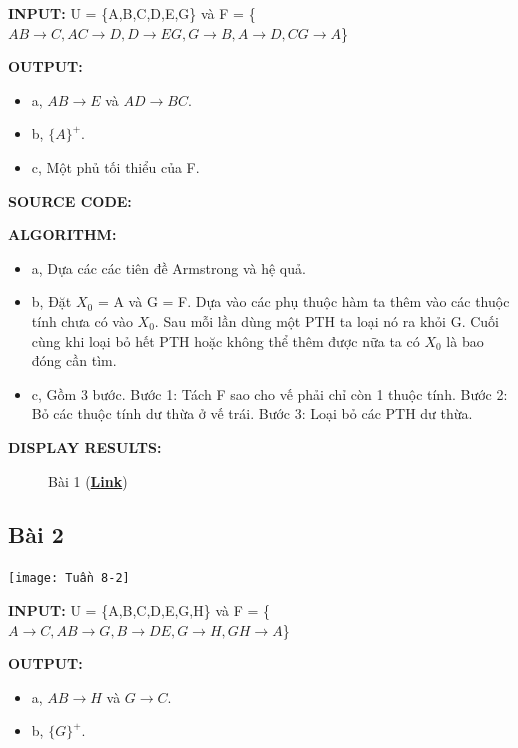 \documentclass[12pt,a4paper]{report}
\begin{document}
	{\bf INPUT:} U = \{A,B,C,D,E,G\} và F = \{$AB\rightarrow C,AC\rightarrow D,D\rightarrow EG,G\rightarrow B,A\rightarrow D,CG\rightarrow A$\}
	
	{\bf OUTPUT:}
	\begin{itemize}
		\item a, $AB\rightarrow E$ và $AD\rightarrow BC$.
		\item b, $\{A\}^+$.
		\item c, Một phủ tối thiểu của F.
	\end{itemize}
	
	{\bf SOURCE CODE:}
	
	{\bf ALGORITHM:}
	\begin{itemize}
		\item a, Dựa các các tiên đề Armstrong và hệ quả.
		\item b, Đặt $X_0$ = A và G = F. Dựa vào các phụ thuộc hàm ta thêm vào các thuộc tính chưa có vào $X_0$. Sau mỗi lần dùng một PTH ta loại nó ra khỏi G. Cuối cùng khi loại bỏ hết PTH hoặc không thể thêm được nữa ta có $X_0$ là bao đóng cần tìm.
		\item c, Gồm 3 bước. Bước 1: Tách F sao cho vế phải chỉ còn 1 thuộc tính. Bước 2: Bỏ các thuộc tính dư thừa ở vế trái. Bước 3: Loại bỏ các PTH dư thừa. 
	\end{itemize}

	{\bf DISPLAY RESULTS:}
		\begin{figure}[!h]
		\hfill
		\hfill
		\hfill
		\hfill
		\caption{Bài 1 (\href{https://drive.google.com/drive/folders/18bppOD8kB9FX16mTBPA5vzgMh5qRWkda}{\bf Link})}
		\end{figure}
	


\subsection{Bài 2}
	\begin{center}
		\texttt{[image: Tuần 8-2]}
	\end{center}

	{\bf INPUT:} U = \{A,B,C,D,E,G,H\} và F = \{$A\rightarrow C,AB\rightarrow G,B\rightarrow DE,G\rightarrow H,GH\rightarrow A$\}
	
	{\bf OUTPUT:}
	\begin{itemize}
		\item a, $AB\rightarrow H$ và $G\rightarrow C$.
		\item b, $\{G\}^+$.
	\end{itemize}
	
\end{document}
